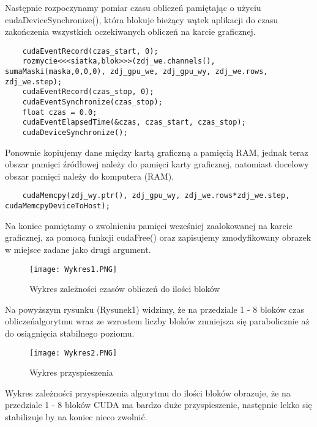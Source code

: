 \documentclass[a4paper,12pt]{article}
\begin{document}
Następnie rozpoczynamy pomiar czasu obliczeń pamiętając o użyciu cudaDeviceSynchronize(), która blokuje bieżący wątek aplikacji do czasu zakończenia wszystkich oczekiwanych obliczeń na karcie graficznej.
\begin{lstlisting}
	cudaEventRecord(czas_start, 0);
	rozmycie<<<siatka,blok>>>(zdj_we.channels(), sumaMaski(maska,0,0,0), zdj_gpu_we, zdj_gpu_wy, zdj_we.rows, zdj_we.step);
	cudaEventRecord(czas_stop, 0);
	cudaEventSynchronize(czas_stop);
	float czas = 0.0;
	cudaEventElapsedTime(&czas, czas_start, czas_stop);
	cudaDeviceSynchronize();
\end{lstlisting}

Ponownie kopiujemy dane między kartą graficzną a pamięcią RAM, jednak teraz obszar pamięci źródłowej należy do pamięci karty graficznej, natomiast docelowy obszar pamięci należy do komputera (RAM).
\begin{lstlisting}
	cudaMemcpy(zdj_wy.ptr(), zdj_gpu_wy, zdj_we.rows*zdj_we.step, cudaMemcpyDeviceToHost);
\end{lstlisting}

Na koniec pamiętamy o zwolnieniu pamięci wcześniej zaalokowanej na karcie graficznej, za pomocą funkcji cudaFree() oraz zapisujemy zmodyfikowany obrazek w miejsce zadane jako drugi argument.

\begin{wrapfigure}{r}{0.5\textwidth}
	\vspace{-40pt}
	\begin{center}
		\texttt{[image: Wykres1.PNG]}
	\end{center}
	\vspace{-20pt}
	\caption{Wykres zależności czasów obliczeń do ilości bloków}
	\vspace{25pt}
\end{wrapfigure}
Na powyższym rysunku (Rysunek1) widzimy, że na przedziale 1 - 8 bloków czas obliczeńalgorytmu wraz ze wzrostem liczby bloków zmniejsza się parabolicznie aż do osiągnięcia stabilnego poziomu.
\begin{wrapfigure}{r}{0.5\textwidth}
	\vspace{0pt}
	\begin{center}
		\texttt{[image: Wykres2.PNG]}
	\end{center}
	\vspace{-20pt}
	\caption{Wykres przyspieszenia}
	\vspace{35pt}
\end{wrapfigure}
Wykres zależności przyspieszenia algorytmu do ilości bloków obrazuje, że na przedziale 1 - 8 bloków CUDA ma bardzo duże przyspieszenie, następnie lekko się stabilizuje by na koniec nieco zwolnić.
\end{document}
